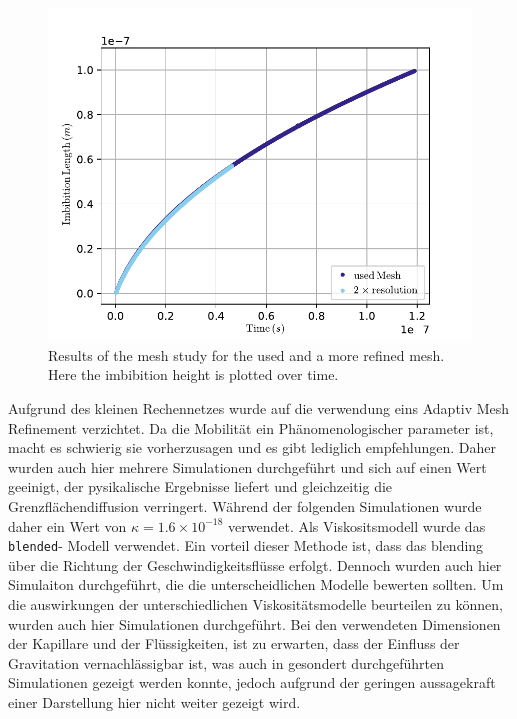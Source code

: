 \begin{figure}[h]
    \centering
    \includegraphics[width=.95\textwidth]{Pictures/Mesh_Study.pdf}
    \caption{Results of the mesh study for the used and a more refined mesh. Here the imbibition height is plotted over time.}
    \label{fig: Mesh_Study}
\end{figure}
Aufgrund des kleinen Rechennetzes wurde auf die verwendung eins Adaptiv Mesh Refinement verzichtet. 
Da die Mobilität ein Phänomenologischer parameter ist, macht es schwierig sie vorherzusagen und es gibt lediglich empfehlungen. Daher wurden auch hier mehrere Simulationen durchgeführt und sich auf einen Wert geeinigt, der pysikalische Ergebnisse liefert und gleichzeitig die Grenzflächendiffusion verringert. Während der folgenden Simulationen wurde daher ein Wert von $\kappa = 1.6 \times 10^{-18}$ verwendet.
Als Viskositsmodell wurde das \texttt{blended}- Modell verwendet. Ein vorteil dieser Methode ist, dass das blending über die Richtung der Geschwindigkeitsflüsse erfolgt. Dennoch wurden auch hier Simulaiton durchgeführt, die die unterscheidlichen Modelle bewerten sollten.
Um die auswirkungen der unterschiedlichen Viskositätsmodelle beurteilen zu können, wurden auch hier Simulationen durchgeführt. 
Bei den verwendeten Dimensionen der Kapillare und der Flüssigkeiten, ist zu erwarten, dass der Einfluss der Gravitation vernachlässigbar ist, was auch in gesondert durchgeführten Simulationen gezeigt werden konnte, jedoch aufgrund der geringen aussagekraft einer Darstellung hier nicht weiter gezeigt wird. 

